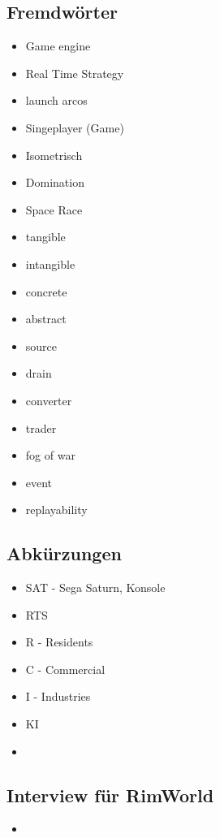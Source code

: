 \subsection*{Fremdwörter}
\begin{itemize}
    \item Game engine
    \item Real Time Strategy
    \item launch arcos
    \item Singeplayer (Game)
    \item Isometrisch
    \item Domination
    \item Space Race
    \item tangible
    \item intangible
    \item concrete
    \item abstract
    \item source
    \item drain
    \item converter
    \item trader
    \item fog of war
    \item event
    \item replayability
\end{itemize}

\subsection*{Abkürzungen}
\begin{itemize}
    \item SAT - Sega Saturn, Konsole
    \item RTS
    \item R - Residents
    \item C - Commercial
    \item I - Industries
    \item KI
    \item 
\end{itemize}

\subsection*{Interview für RimWorld}
\begin{itemize}
    \item 
\end{itemize}